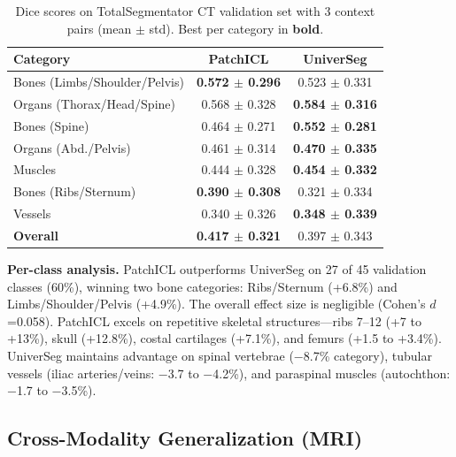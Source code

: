 \documentclass[runningheads]{llncs}
\begin{document}
\begin{table}[t]
\centering
\caption{Dice scores on TotalSegmentator CT validation set with 3 context pairs (mean $\pm$ std). Best per category in \textbf{bold}.}\label{tab:dice_totalseg_ct}
\begin{tabular}{lcc}
\toprule
Category & PatchICL & UniverSeg \\
\midrule
Bones (Limbs/Shoulder/Pelvis)  & \textbf{0.572 $\pm$ 0.296} & 0.523 $\pm$ 0.331 \\
Organs (Thorax/Head/Spine)     & 0.568 $\pm$ 0.328 & \textbf{0.584 $\pm$ 0.316} \\
Bones (Spine)                  & 0.464 $\pm$ 0.271 & \textbf{0.552 $\pm$ 0.281} \\
Organs (Abd./Pelvis)           & 0.461 $\pm$ 0.314 & \textbf{0.470 $\pm$ 0.335} \\
Muscles                        & 0.444 $\pm$ 0.328 & \textbf{0.454 $\pm$ 0.332} \\
Bones (Ribs/Sternum)           & \textbf{0.390 $\pm$ 0.308} & 0.321 $\pm$ 0.334 \\
Vessels                        & 0.340 $\pm$ 0.326 & \textbf{0.348 $\pm$ 0.339} \\
\midrule
\textbf{Overall}               & \textbf{0.417 $\pm$ 0.321} & 0.397 $\pm$ 0.343 \\
\bottomrule
\end{tabular}
\end{table}

\textbf{Per-class analysis.} PatchICL outperforms UniverSeg on 27 of 45 validation classes (60\%), winning two bone categories: Ribs/Sternum (+6.8\%) and Limbs/Shoulder/Pelvis (+4.9\%). The overall effect size is negligible (Cohen's $d$=0.058). PatchICL excels on repetitive skeletal structures---ribs 7--12 (+7 to +13\%), skull (+12.8\%), costal cartilages (+7.1\%), and femurs (+1.5 to +3.4\%). UniverSeg maintains advantage on spinal vertebrae ($-$8.7\% category), tubular vessels (iliac arteries/veins: $-$3.7 to $-$4.2\%), and paraspinal muscles (autochthon: $-$1.7 to $-$3.5\%).

\subsection{Cross-Modality Generalization (MRI)}
                                                                                                                                                                                                                        
\end{document}
